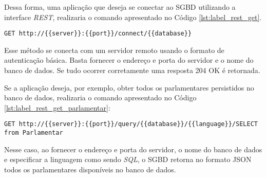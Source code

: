 	Dessa forma, uma aplicação que deseja se conectar ao SGBD utilizando a interface \textit{REST}, realizaria o comando apresentado no Código \ref{lst:label_rest_get}. 
	
\begin{lstlisting}[label={lst:label_rest_get}, caption={Exemplo de conexão com o OrientDB utilizando o protocolo HTTP.},captionpos=b]
GET http://{{server}}:{{port}}/connect/{{database}}
\end{lstlisting}

	Esse método se conecta com um servidor remoto usando o formato de autenticação básica. Basta fornecer o endereço e porta do servidor e o nome do banco de dados. Se tudo ocorrer corretamente uma resposta 204 OK é retornada.
	
	Se a aplicação deseja, por exemplo, obter todos os parlamentares persistidos no banco de dados,  realizaria o comando apresentado no Código \ref{lst:label_rest_get_parlamentar}:
	
\begin{lstlisting}[label={lst:label_rest_get_parlamentar}, caption={Exemplo de consulta no OrientDB utilizando o protocolo HTTP.},captionpos=b]
GET http://{{server}}:{{port}}/query/{{database}}/{{language}}/SELECT 
from Parlamentar
\end{lstlisting}

	Nesse caso, ao fornecer o endereço e porta do servidor, o nome do banco de dados e especificar a linguagem como sendo \textit{SQL}, o SGBD retorna no formato JSON todos os parlamentares disponíveis no banco de dados.
